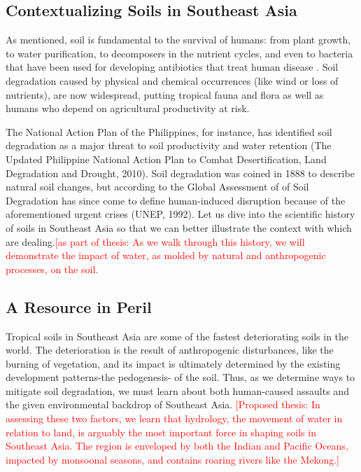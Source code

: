 \subsection{Contextualizing Soils in Southeast Asia}

As mentioned, soil is fundamental to the survival of humans: from plant growth, to water purification, to decomposers in the nutrient cycles, and even to bacteria that have been used for developing antibiotics that treat human disease \citep{asio2006morphology}. Soil degradation caused by physical and chemical occurrences (like wind or loss of nutrients), are now widespread, putting tropical fauna and flora as well as humans who depend on agricultural productivity at risk. 

The National Action Plan of the Philippines, for instance, has identified soil degradation as a major threat to soil productivity and water retention (The Updated Philippine National Action Plan to Combat Desertification, Land Degradation and Drought, 2010). Soil degradation was coined in 1888 to describe natural soil changes, but according to the Global Assessment of of Soil Degradation has since come to define human-induced disruption because of the aforementioned urgent crises (UNEP, 1992). Let us dive into the scientific history of soils in Southeast Asia so that we can better illustrate the context with which are dealing.\textcolor{red}{[as part of thesis: As we walk through this history, we will demonstrate the impact of water, as molded by natural and anthropogenic processes, on the soil.}

\subsection{A Resource in Peril}

Tropical soils in Southeast Asia are some of the fastest deteriorating soils in the world. The deterioration is the result of anthropogenic disturbances, like the burning of vegetation, and its impact is ultimately determined by the existing development patterns-the pedogenesis- of the soil. Thus, as we determine ways to mitigate soil degradation, we must learn about both human-caused assaults and the given environmental backdrop of Southeast Asia. \textcolor{red}{[Proposed thesis: In assessing these two factors, we learn that hydrology, the movement of water in relation to land, is arguably the most important force in shaping soils in Southeast Asia. The region is enveloped by both the Indian and Pacific Oceans, impacted by monsoonal seasons, and contains roaring rivers like the Mekong.]} 

